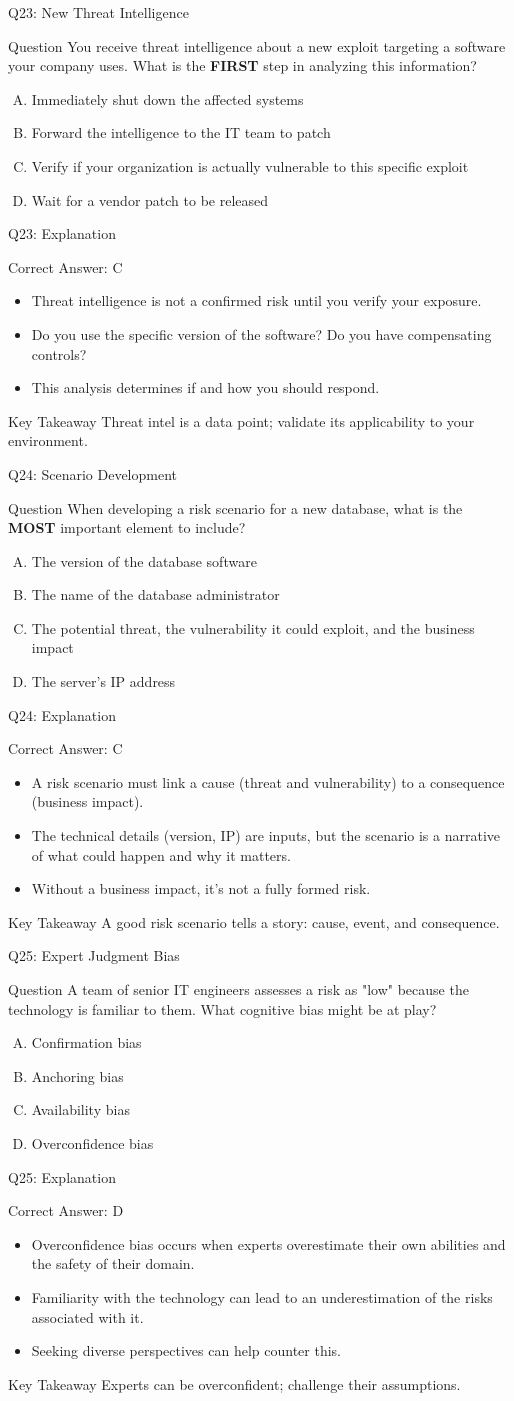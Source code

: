 \documentclass[aspectratio=169]{beamer}
\newcommand{\hq}[7]{%
	\begin{frame}{Q#1: #2}
		\begin{block}{Question}
			#3
		\end{block}
		\begin{enumerate}[(A)]
			#4
		\end{enumerate}
	\end{frame}
	\begin{frame}{Q#1: Explanation}
		\begin{block}{Correct Answer: #5}
			\begin{itemize}
				#6
			\end{itemize}
		\end{block}
		\begin{alertblock}{Key Takeaway}
			#7
		\end{alertblock}
	\end{frame}
}
\begin{document}
	\hq{23}{New Threat Intelligence}
	{You receive threat intelligence about a new exploit targeting a software your company uses. What is the \textbf{FIRST} step in analyzing this information?}
	{\item Immediately shut down the affected systems
		\item Forward the intelligence to the IT team to patch
		\item Verify if your organization is actually vulnerable to this specific exploit
		\item Wait for a vendor patch to be released}
	{C}
	{\item Threat intelligence is not a confirmed risk until you verify your exposure.
		\item Do you use the specific version of the software? Do you have compensating controls?
		\item This analysis determines if and how you should respond.}
	{Threat intel is a data point; validate its applicability to your environment.}
	
	\hq{24}{Scenario Development}
	{When developing a risk scenario for a new database, what is the \textbf{MOST} important element to include?}
	{\item The version of the database software
		\item The name of the database administrator
		\item The potential threat, the vulnerability it could exploit, and the business impact
		\item The server's IP address}
	{C}
	{\item A risk scenario must link a cause (threat and vulnerability) to a consequence (business impact).
		\item The technical details (version, IP) are inputs, but the scenario is a narrative of what could happen and why it matters.
		\item Without a business impact, it's not a fully formed risk.}
	{A good risk scenario tells a story: cause, event, and consequence.}
	
	\hq{25}{Expert Judgment Bias}
	{A team of senior IT engineers assesses a risk as "low" because the technology is familiar to them. What cognitive bias might be at play?}
	{\item Confirmation bias
		\item Anchoring bias
		\item Availability bias
		\item Overconfidence bias}
	{D}
	{\item Overconfidence bias occurs when experts overestimate their own abilities and the safety of their domain.
		\item Familiarity with the technology can lead to an underestimation of the risks associated with it.
		\item Seeking diverse perspectives can help counter this.}
	{Experts can be overconfident; challenge their assumptions.}
	
\end{document}
